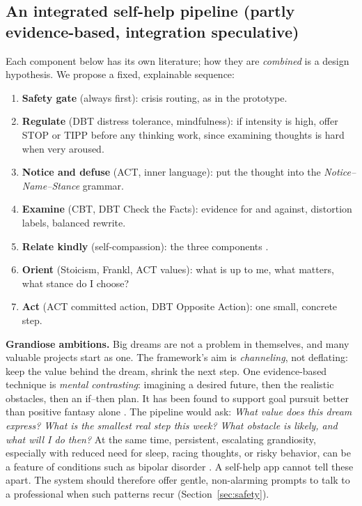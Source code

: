 \documentclass[11pt]{article}
\begin{document}
\subsection{An integrated self-help pipeline (partly evidence-based, integration speculative)}
Each component below has its own literature; how they are \emph{combined} is a design hypothesis. We propose a fixed, explainable sequence:
\begin{enumerate}
\item \textbf{Safety gate} (always first): crisis routing, as in the prototype.
\item \textbf{Regulate} (DBT distress tolerance, mindfulness): if intensity is high, offer STOP or TIPP before any thinking work, since examining thoughts is hard when very aroused.
\item \textbf{Notice and defuse} (ACT, inner language): put the thought into the \emph{Notice--Name--Stance} grammar.
\item \textbf{Examine} (CBT, DBT Check the Facts): evidence for and against, distortion labels, balanced rewrite.
\item \textbf{Relate kindly} (self-compassion): the three components \citep{neff2003}.
\item \textbf{Orient} (Stoicism, Frankl, ACT values): what is up to me, what matters, what stance do I choose?
\item \textbf{Act} (ACT committed action, DBT Opposite Action): one small, concrete step.
\end{enumerate}

\textbf{Grandiose ambitions.} Big dreams are not a problem in themselves, and many valuable projects start as one. The framework's aim is \emph{channeling}, not deflating: keep the value behind the dream, shrink the next step. One evidence-based technique is \emph{mental contrasting}: imagining a desired future, then the realistic obstacles, then an if--then plan. It has been found to support goal pursuit better than positive fantasy alone \citep{oettingen2014}. The pipeline would ask: \emph{What value does this dream express? What is the smallest real step this week? What obstacle is likely, and what will I do then?} At the same time, persistent, escalating grandiosity, especially with reduced need for sleep, racing thoughts, or risky behavior, can be a feature of conditions such as bipolar disorder \citep{apa2013}. A self-help app cannot tell these apart. The system should therefore offer gentle, non-alarming prompts to talk to a professional when such patterns recur (Section~\ref{sec:safety}).
\end{document}
